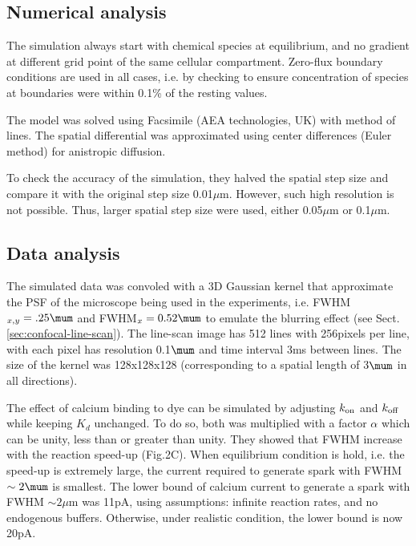 


\subsection{Numerical analysis}
\label{sec:numerical-analysis-6}


The simulation always start with chemical species at equilibrium, and no
gradient at different grid point of the same cellular compartment. Zero-flux
boundary conditions are used in all cases, i.e. by checking to ensure
concentration of species at boundaries were within 0.1\% of the resting values.

The model was solved using Facsimile (AEA technologies, UK) with
method of lines. The spatial differential was approximated using
center differences (Euler method) for anistropic diffusion. 

To check the accuracy of the simulation, they halved the spatial step
size and compare it with the original step size 0.01$\mu$m. However,
such high resolution is not possible. Thus, larger spatial step size
were used, either 0.05$\mu$m or 0.1$\mu$m.

\subsection{Data analysis}
\label{sec:data-analysis-6}

The simulated data was convoled with a 3D Gaussian kernel that approximate the
PSF of the microscope being used in the experiments, i.e. FWHM$_{x,y}=.25\mum$
and FWHM$_x=0.52\mum$ to emulate the blurring effect (see
Sect.\ref{sec:confocal-line-scan}). The line-scan image has 512 lines with
256pixels per line, with each pixel has resolution 0.1$\mum$ and time interval
3ms between lines. The size of the kernel was 128x128x128 (corresponding to a
spatial length of 3$\mum$ in all directions).

The effect of calcium binding to dye can be simulated by adjusting $k_{\text{on}}$ and
$k_{\text{off}}$ while keeping $K_d$ unchanged. To do so, both was multiplied with a
factor $\alpha$ which can be unity, less than or greater than unity. They showed
that FWHM increase with the reaction speed-up (Fig.2C). When equilibrium
condition is hold, i.e. the speed-up is extremely large, the current required to
generate spark with FWHM $\sim 2\mum$ is smallest. The lower bound of calcium
current to generate a spark with FWHM $\sim 2\mu$m was 11pA, using assumptions:
infinite reaction rates, and no endogenous buffers. 
Otherwise, under realistic condition, the lower bound is now 20pA.

